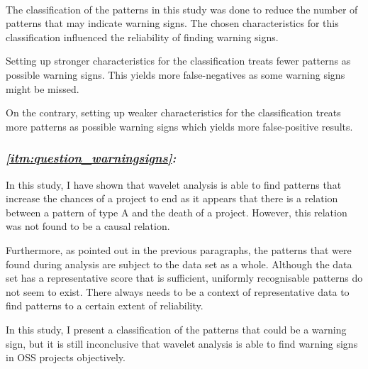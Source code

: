 \paragraph{}
The classification of the patterns in this study was done to reduce the
number of patterns that may indicate warning signs. The chosen characteristics
for this classification influenced the reliability of finding warning signs.

Setting up stronger characteristics for the classification treats fewer
patterns as possible warning signs. This yields more false-negatives as some
warning signs might be missed.

On the contrary, setting up weaker characteristics for the classification treats
more patterns as possible warning signs which yields more false-positive
results.

\subsubsection{\textit{\ref{itm:question_warningsigns}: \researchQuestion}}
In this study, I have shown that wavelet analysis is able to find patterns that
increase the chances of a project to end as it appears that there is a relation
between a pattern of type A and the death of a project. However, this relation
was not found to be a causal relation.

Furthermore, as pointed out in the previous paragraphs, the patterns that were
found during analysis are subject to the data set as a whole. Although the data
set has a representative score that is sufficient, uniformly recognisable
patterns do not seem to exist. There always needs to be a context of
representative data to find patterns to a certain extent of reliability.

In this study, I present a classification of the patterns that could be a
warning sign, but it is still inconclusive that wavelet analysis is able to
find warning signs in OSS projects objectively.
